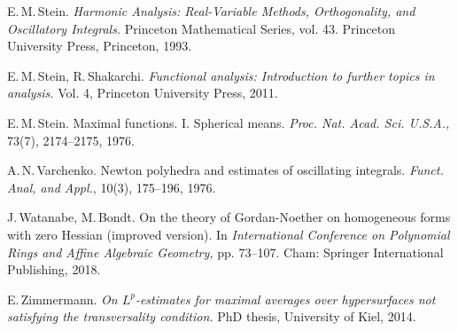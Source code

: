 \documentclass[a4paper, 11pt]{article}
\theoremstyle{plain}
\theoremstyle{definition}
\theoremstyle{lemma}
\theoremstyle{Remark}
\theoremstyle{proposition}
\theoremstyle{corollary}
\theoremstyle{example}
\theoremstyle{assumption}
\begin{document}
\begin{thebibliography}{}




 E.\,M.\,Stein. \textit{Harmonic Analysis: Real-Variable Methods, Orthogonality, and Oscillatory Integrals.}
Princeton Mathematical Series, vol. 43. Princeton University Press, Princeton, 1993.




 E.\,M.\,Stein, R.\,Shakarchi. \textit{Functional analysis: Introduction to further topics in analysis.} Vol. 4, Princeton University Press, 2011.

 E.\,M.\,Stein. Maximal functions. I. Spherical means. \textit{Proc. Nat. Acad. Sci. U.S.A.,} 73(7), 2174--2175, 1976.






 A.\,N.\,Varchenko. Newton polyhedra and estimates of oscillating integrals. \textit{Funct. Anal, and
Appl.}, 10(3), 175--196, 1976.





 J.\,Watanabe,  M.\,Bondt. On the theory of Gordan-Noether on homogeneous forms with zero Hessian (improved version). In \textit{International Conference on Polynomial Rings and Affine Algebraic Geometry,} pp. 73--107. Cham: Springer International Publishing, 2018.



 E.\,Zimmermann. \textit{On $L^p$-estimates for maximal averages over hypersurfaces
not satisfying the transversality condition.} PhD thesis, University of Kiel, 2014.












\end{thebibliography}{}
\end{document}
